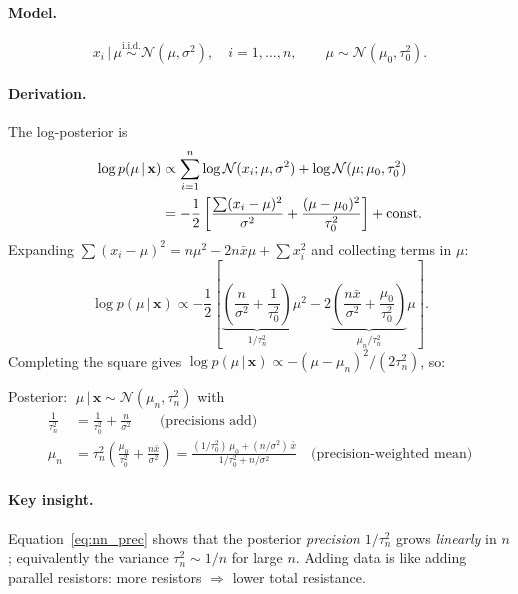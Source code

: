 \documentclass[11pt, a4paper]{article}
\newcommand{\N}{\mathcal{N}}
\theoremstyle{definition}
\begin{document}
\paragraph{Model.}
\[
  x_i\,|\,\mu \overset{\mathrm{i.i.d.}}{\sim} \N(\mu,\sigma^2),\quad i=1,\ldots,n,
  \qquad
  \mu\sim\N(\mu_0,\tau_0^2).
\]

\paragraph{Derivation.}
The log-posterior is
\begin{align}
  \log p(\mu\,|\,\mathbf{x}) &\propto
  \sum_{i=1}^n \log\N(x_i;\mu,\sigma^2) + \log\N(\mu;\mu_0,\tau_0^2)
  \notag\\
  &= -\frac{1}{2}\left[
    \frac{\sum(x_i-\mu)^2}{\sigma^2}
    +\frac{(\mu-\mu_0)^2}{\tau_0^2}
  \right] + \mathrm{const}.
  \label{eq:nn_logpost}
\end{align}
Expanding $\sum(x_i-\mu)^2 = n\mu^2 - 2n\bar{x}\mu + \sum x_i^2$ and
collecting terms in $\mu$:
\begin{equation}
  \log p(\mu\,|\,\mathbf{x}) \propto
  -\frac{1}{2}\left[\underbrace{\left(\frac{n}{\sigma^2}+\frac{1}{\tau_0^2}\right)}_{\displaystyle 1/\tau_n^2}
  \mu^2
  - 2\underbrace{\left(\frac{n\bar{x}}{\sigma^2}+\frac{\mu_0}{\tau_0^2}\right)}_{\displaystyle \mu_n/\tau_n^2}\mu\right].
\end{equation}
Completing the square gives $\log p(\mu\,|\,\mathbf{x})\propto -(\mu-\mu_n)^2/(2\tau_n^2)$, so:

\begin{tcolorbox}[colback=blue!5, colframe=blue!50!black, title=Normal-Normal update, fontupper=\small]
Posterior: $\;\mu\,|\,\mathbf{x}\sim\N(\mu_n,\tau_n^2)$ \quad with
\begin{align}
  \frac{1}{\tau_n^2} &= \frac{1}{\tau_0^2} + \frac{n}{\sigma^2}
    \qquad\text{(precisions add)}\label{eq:nn_prec}\\[4pt]
  \mu_n &= \tau_n^2\!\left(\frac{\mu_0}{\tau_0^2}+\frac{n\bar{x}}{\sigma^2}\right)
    = \frac{(1/\tau_0^2)\,\mu_0 + (n/\sigma^2)\,\bar{x}}{1/\tau_0^2+n/\sigma^2}
    \quad\text{(precision-weighted mean)}\label{eq:nn_mean}
\end{align}
\end{tcolorbox}

\paragraph{Key insight.}
Equation~\eqref{eq:nn_prec} shows that the posterior \emph{precision}
$1/\tau_n^2$ grows \emph{linearly} in $n$; equivalently the variance
$\tau_n^2\sim 1/n$ for large $n$.  Adding data is like adding parallel
resistors: more resistors $\Rightarrow$ lower total resistance.
\end{document}
